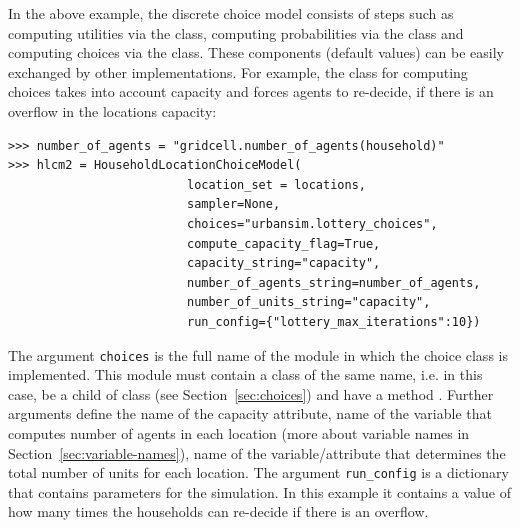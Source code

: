 In the above example, the discrete choice model consists of steps such as
computing utilities via the  class, computing
probabilities via the  class and computing
choices via the  class. These components
(default values) can be easily exchanged by other implementations. For
example, the class  for computing choices
takes into account capacity and forces agents to re-decide, if there is an
overflow in the locations capacity:
\begin{verbatim}
>>> number_of_agents = "gridcell.number_of_agents(household)"
>>> hlcm2 = HouseholdLocationChoiceModel(
                         location_set = locations,
                         sampler=None,
                         choices="urbansim.lottery_choices",
                         compute_capacity_flag=True,
                         capacity_string="capacity",
                         number_of_agents_string=number_of_agents,
                         number_of_units_string="capacity",
                         run_config={"lottery_max_iterations":10})
\end{verbatim}

The argument \verb|choices| is the full name of the module in which the choice
class is implemented. This module
must contain a class of the same name, i.e.
 in this case, be a child of  class 
(see Section~\ref{sec:choices}) and have a method .  Further arguments define the name of
the capacity attribute, \attributesindex name of the variable \variablesindex that computes number of agents in
each location (more about variable \variablesindex names in Section~\ref{sec:variable-names}), name of the
variable/attribute \attributesindex \variablesindex that determines the total number of units for each location. 
The argument \verb|run_config| is a dictionary that contains parameters for the simulation. In this example it contains a value
of how many times the households can re-decide if there is an overflow.

